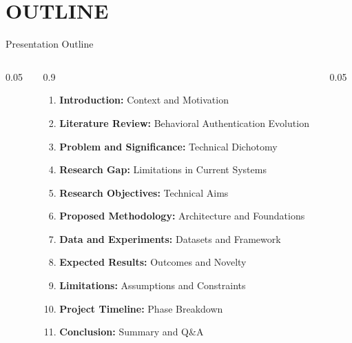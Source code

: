 \section{OUTLINE} \label{Table Of Contents}

\begin{frame}{Presentation Outline}
    \begin{columns}
        \begin{column}{0.05\textwidth}
        \end{column}
        
        \begin{column}{0.9\textwidth}
            \vspace{-1.5em}
            \begin{enumerate}
                \setlength{\itemsep}{0.5ex} 
                
                \item \textbf{Introduction:} Context and Motivation
                \item \textbf{Literature Review:} Behavioral Authentication Evolution
                \item \textbf{Problem and Significance:} Technical Dichotomy
                \item \textbf{Research Gap:} Limitations in Current Systems
                \item \textbf{Research Objectives:} Technical Aims
                \item \textbf{Proposed Methodology:} Architecture and Foundations
                \item \textbf{Data and Experiments:} Datasets and Framework
                \item \textbf{Expected Results:} Outcomes and Novelty
                \item \textbf{Limitations:} Assumptions and Constraints
                \item \textbf{Project Timeline:} Phase Breakdown
                \item \textbf{Conclusion:} Summary and Q\&A
            \end{enumerate}
        \end{column}
        
        \begin{column}{0.05\textwidth}
        \end{column}
    \end{columns}
\end{frame}